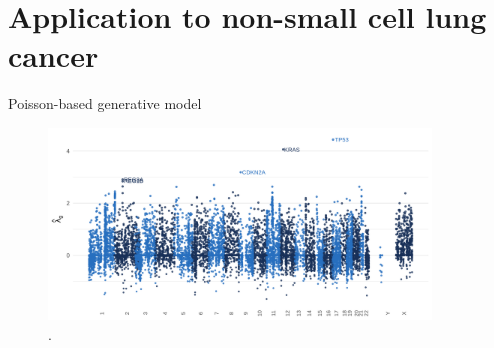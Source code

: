 \documentclass{beamer}
\begin{document}
\section{Application to non-small cell lung cancer}
\begin{frame}{Poisson-based generative model}

\begin{figure}[htbp]
\centering
\includegraphics[width=4in]{figures/fig4.png}
\caption{ . \label{fig:3}}
\end{figure}
    
\end{frame}
\end{document}
